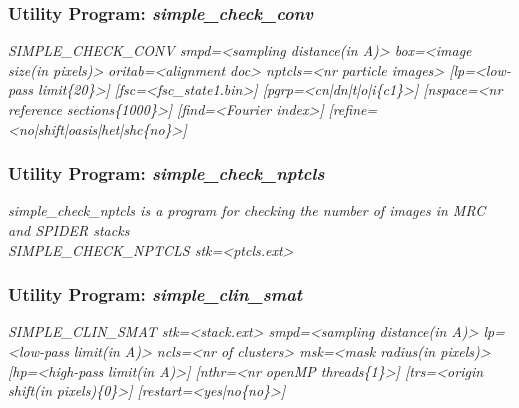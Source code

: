 \documentclass[review]{elsarticle}
\begin{document}
\subsubsection{Utility Program: {\it{simple\_check\_conv}}}
\label{check_conv}
{\it{SIMPLE\_CHECK\_CONV smpd=<sampling distance(in A)> box=<image size(in pixels)>}}
{\it{oritab=<alignment doc> nptcls=<nr particle images> [lp=<low-pass limit\{20\}>]}}
{\it{[fsc=<fsc\_state1.bin>] [pgrp=<cn|dn|t|o|i\{c1\}>] [nspace=<nr reference}}
{\it{sections\{1000\}>] [find=<Fourier index>]}}
{\it{[refine=<no|shift|oasis|het|shc\{no\}>]}}

\subsubsection{Utility Program: {\it{simple\_check\_nptcls}}}
\label{check_nptcls}
{\it{simple\_check\_nptcls} is a program for checking the number of images in MRC and SPIDER stacks}\\
{\it{SIMPLE\_CHECK\_NPTCLS stk=<ptcls.ext>}}

\subsubsection{Utility Program: {\it{simple\_clin\_smat}}}
\label{clin_smat}
{\it{SIMPLE\_CLIN\_SMAT stk=<stack.ext> smpd=<sampling distance(in A)> lp=<low-pass}}
{\it{limit(in A)> ncls=<nr of clusters> msk=<mask radius(in pixels)> [hp=<high-pass}}
{\it{limit(in A)>] [nthr=<nr openMP threads\{1\}>] [trs=<origin shift(in}}
{\it{pixels)\{0\}>] [restart=<yes|no\{no\}>]}}
\end{document}
